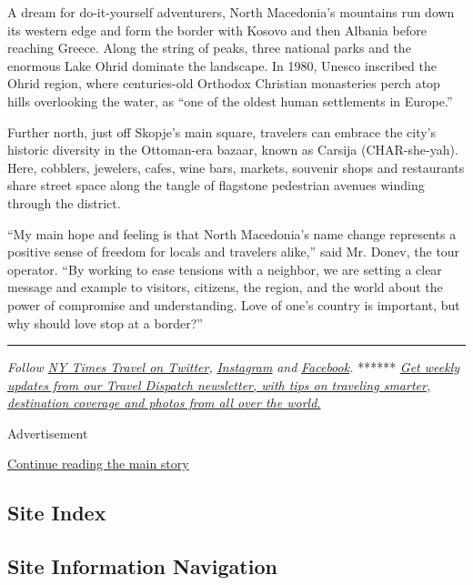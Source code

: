 A dream for do-it-yourself adventurers, North Macedonia's mountains run
down its western edge and form the border with Kosovo and then Albania
before reaching Greece. Along the string of peaks, three national parks
and the enormous Lake Ohrid dominate the landscape. In 1980, Unesco
inscribed the Ohrid region, where centuries-old Orthodox Christian
monasteries perch atop hills overlooking the water, as ``one of the
oldest human settlements in Europe.''

Further north, just off Skopje's main square, travelers can embrace the
city's historic diversity in the Ottoman-era bazaar, known as Carsija
(CHAR-she-yah). Here, cobblers, jewelers, cafes, wine bars, markets,
souvenir shops and restaurants share street space along the tangle of
flagstone pedestrian avenues winding through the district.

``My main hope and feeling is that North Macedonia's name change
represents a positive sense of freedom for locals and travelers alike,''
said Mr. Donev, the tour operator. ``By working to ease tensions with a
neighbor, we are setting a clear message and example to visitors,
citizens, the region, and the world about the power of compromise and
understanding. Love of one's country is important, but why should love
stop at a border?''

\begin{center}\rule{0.5\linewidth}{\linethickness}\end{center}

\emph{Follow} \href{https://twitter.com/nytimestravel}{\emph{NY Times
Travel on Twitter}}\emph{,}
\href{https://www.instagram.com/nytimestravel/}{\emph{Instagram}}
\emph{and}
\href{https://www.facebook.com/nytimestravel/}{\emph{Facebook}}\emph{.}
******
\href{https://www.nytimes.com/newsletters/traveldispatch?module=inline}{\emph{Get
weekly updates from our Travel Dispatch newsletter, with tips on
traveling smarter, destination coverage and photos from all over the
world.}}

Advertisement

\protect\hyperlink{after-bottom}{Continue reading the main story}

\hypertarget{site-index}{%
\subsection{Site Index}\label{site-index}}

\hypertarget{site-information-navigation}{%
\subsection{Site Information
Navigation}\label{site-information-navigation}}

